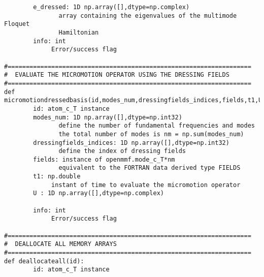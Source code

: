 \documentclass[10pt,a4paper]{article}
\begin{document}
\begin{verbatim}
        e_dressed: 1D np.array([],dtype=np.complex)
               array containing the eigenvalues of the multimode Floquet
               Hamiltonian
        info: int
             Error/success flag

#===================================================================
#  EVALUATE THE MICROMOTION OPERATOR USING THE DRESSING FIELDS
#===================================================================
def micromotiondressedbasis(id,modes_num,dressingfields_indices,fields,t1,U,info):
        id: atom_c_T instance
        modes_num: 1D np.array([],dtype=np.int32)
               define the number of fundamental frequencies and modes
               the total number of modes is nm = np.sum(modes_num)
        dressingfields_indices: 1D np.array([],dtype=np.int32)
               define the index of dressing fields
        fields: instance of openmmf.mode_c_T*nm 
               equivalent to the FORTRAN data derived type FIELDS
        t1: np.double
             instant of time to evaluate the micromotion operator
        U : 1D np.array([],dtype=np.complex)
             
        info: int
             Error/success flag

#===================================================================
#  DEALLOCATE ALL MEMORY ARRAYS
#===================================================================
def deallocateall(id):
        id: atom_c_T instance


\end{verbatim}
\end{document}
